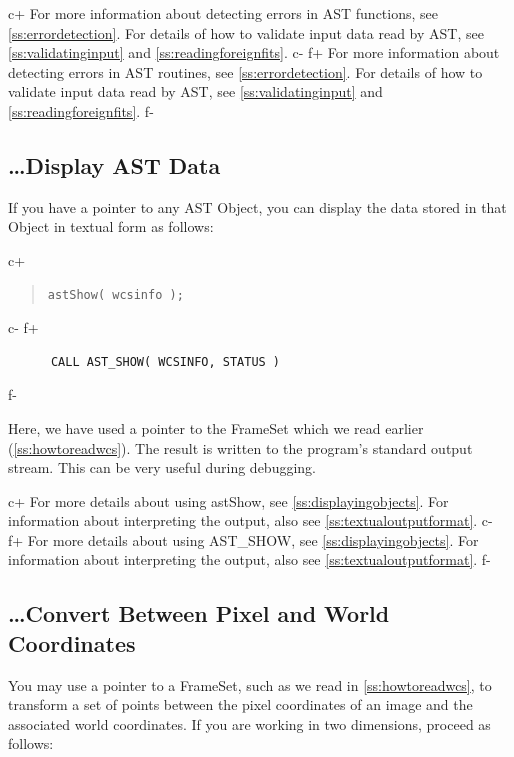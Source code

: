 \documentclass[twoside,11pt]{article}
\newcommand{\secref}[1]{\S\ref{#1}}
\renewcommand{\secref}[1]{\ref{#1}}
\begin{document}
c+
For more information about detecting errors in AST functions, see
\secref{ss:errordetection}. For details of how to validate input data
read by AST, see \secref{ss:validatinginput} and
\secref{ss:readingforeignfits}.
c-
f+
For more information about detecting errors in AST routines, see
\secref{ss:errordetection}. For details of how to validate input data
read by AST, see \secref{ss:validatinginput} and
\secref{ss:readingforeignfits}.
f-

\subsection{\ldots Display AST Data}

If you have a pointer to any AST Object, you can display the data
stored in that Object in textual form as follows:

c+
\begin{quote}
\small
\begin{verbatim}
astShow( wcsinfo );
\end{verbatim}
\normalsize
\end{quote}
c-
f+
\small
\begin{verbatim}
      CALL AST_SHOW( WCSINFO, STATUS )
\end{verbatim}
\normalsize
f-

Here, we have used a pointer to the FrameSet which we read earlier
(\secref{ss:howtoreadwcs}).  The result is written to the program's
standard output stream. This can be very useful during debugging.

c+
For more details about using astShow, see
\secref{ss:displayingobjects}. For information about interpreting the
output, also see \secref{ss:textualoutputformat}.
c-
f+
For more details about using AST\_SHOW, see
\secref{ss:displayingobjects}. For information about interpreting the
output, also see \secref{ss:textualoutputformat}.
f-

\subsection{\label{ss:howtotransform}\ldots Convert Between Pixel and World Coordinates}

You may use a pointer to a FrameSet, such as we read in
\secref{ss:howtoreadwcs}, to transform a set of points between the
pixel coordinates of an image and the associated world coordinates. If
you are working in two dimensions, proceed as follows:
\end{document}
